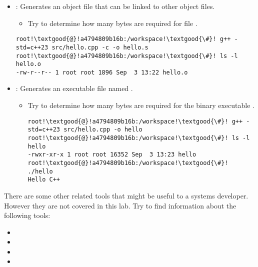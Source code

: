 \begin{itemize}
  \item {}:
  Generates an object file  that can be linked to other object
  files.
    \begin{itemize}
      \item Try to determine how many bytes are required for file .
    \end{itemize}
\begin{lstlisting}[style=terminal,escapechar=!]
root!\textgood{@}!a4794809b16b:/workspace!\textgood{\#}! g++ -std=c++23 src/hello.cpp -c -o hello.s
root!\textgood{@}!a4794809b16b:/workspace!\textgood{\#}! ls -l hello.o
-rw-r--r-- 1 root root 1896 Sep  3 13:22 hello.o
\end{lstlisting}

  \item {}:
        Generates an executable file named .
    \begin{itemize}
      \item Try to determine how many bytes are required for the binary
            executable .
\begin{lstlisting}[style=terminal,escapechar=!]
root!\textgood{@}!a4794809b16b:/workspace!\textgood{\#}! g++ -std=c++23 src/hello.cpp -o hello
root!\textgood{@}!a4794809b16b:/workspace!\textgood{\#}! ls -l hello
-rwxr-xr-x 1 root root 16352 Sep  3 13:23 hello
root!\textgood{@}!a4794809b16b:/workspace!\textgood{\#}! ./hello
Hello C++
\end{lstlisting}
    \end{itemize}
\end{itemize}

There are some other related tools that might be useful to a systems developer.
However they are not covered in this lab.
Try to find information about the following tools:

\begin{itemize}
  \item {}
  \item {}
  \item {}
  \item {}
\end{itemize}

